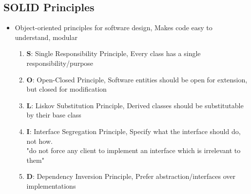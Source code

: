\documentclass[a4paper]{article}
\begin{document}
\subsection{SOLID Principles}
\begin{itemize}
    \item Object-oriented principles for software design, Makes code easy to understand, modular
    \begin{enumerate}
        \item \textbf{S}: Single Responsibility Principle, Every class has a single responsibility/purpose
        \item \textbf{O}: Open-Closed Principle, Software entities should be open for extension, but closed for modification
        \item \textbf{L}: Liskov Substitution Principle, Derived classes should be substitutable by their base class
        \item \textbf{I}: Interface Segregation Principle, Specify what the interface should do, not how.\\
        "do not force any client to implement an interface which is irrelevant to them"
        \item \textbf{D}: Dependency Inversion Principle, Prefer abstraction/interfaces over implementations
    \end{enumerate}
\end{itemize}
\end{document}
